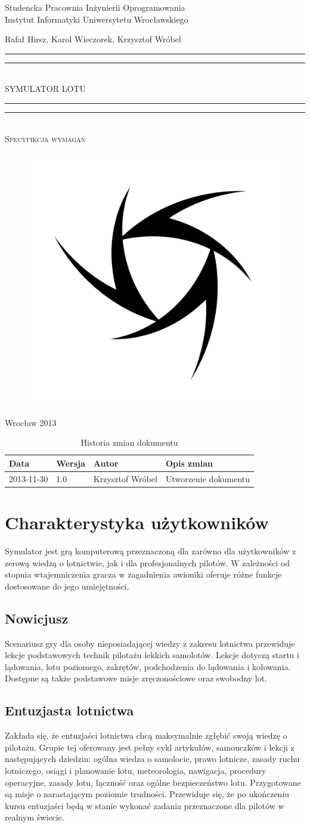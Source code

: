 \documentclass{mwrep}
\newcommand*{\titleGP}{\begingroup
\centering

{\large Studencka Pracownia Inżynierii Oprogramowania}\\Instytut Informatyki Uniwersytetu Wrocławskiego\par
\vspace*{16\baselineskip}

{\Large Rafał Hirsz, Karol Wieczorek, Krzysztof Wróbel\par}
\vspace*{\baselineskip}

\rule{\textwidth}{1.6pt}\vspace*{-\baselineskip}\vspace*{2pt}
\rule{\textwidth}{0.4pt}\\[\baselineskip]

{\Huge SYMULATOR LOTU}\\[0.2\baselineskip]

\rule{\textwidth}{0.4pt}\vspace*{-\baselineskip}\vspace{3.2pt}
\rule{\textwidth}{1.6pt}\\[\baselineskip]

\scshape
{\huge Specyfikcja wymagań}\par
\vspace*{2\baselineskip}

\begin{figure}[h]
\centering
\includegraphics[width=5\baselineskip]{flightsim-team-logo.pdf}
\end{figure}
\vfill

{\large Wrocław 2013}\par

\pagebreak

\endgroup}
\begin{document}
\thispagestyle{empty}
\titleGP

\begin{center}
\begin{table}[h]
\begin{center}
\begin{tabularx}{1\textwidth}{|l|l|l|X|}
\hline
Data & Wersja & Autor & Opis zmian \\ \hline
2013-11-30 & 1.0 & Krzysztof Wróbel & Utworzenie dokumentu \\
\hline
\end{tabularx}
\end{center}
\vspace{3ex}
\caption{Historia zmian dokumentu}\label{T:Zmiany}
\end{table}
\end{center}

\pagebreak

\tableofcontents

\chapter{Charakterystyka użytkowników}

Symulator jest grą komputerową przeznaczoną dla zarówno dla użytkowników z zerową wiedzą o lotnictwie, jak i dla profesjonalnych pilotów. W zależności od stopnia wtajemniczenia gracza w zagadnienia awioniki oferuje różne funkcje dostosowane do jego umiejętności.

\section{Nowicjusz}

Scenariusz gry dla osoby nieposiadającej wiedzy z zakresu lotnictwa przewiduje lekcje podstawowych technik pilotażu lekkich samolotów. Lekcje dotyczą startu i lądowania, lotu poziomego, zakrętów, podchodzenia do lądowania i kołowania. Dostępne są także podstawowe misje zręczonościowe oraz swobodny lot.

\section{Entuzjasta lotnictwa}

Zakłada się, że entuzjaści lotnictwa chcą maksymalnie zgłębić swoją wiedzę o pilotażu. Grupie tej oferowany jest pełny cykl artykułów, samouczków i lekcji z następujących dziedzin: ogólna wiedza o samolocie, prawo lotnicze, zasady ruchu lotniczego, osiągi i planowanie lotu, meteorologia, nawigacja, procedury operacyjne, zasady lotu, łączność oraz ogólne bezpieczeństwo lotu. Przygotowane są misje o narastającym poziomie trudności. Przewiduje się, że po ukończeniu kursu entuzjaści będą w stanie wykonać zadania przeznaczone dla pilotów w realnym świecie.
\end{document}
